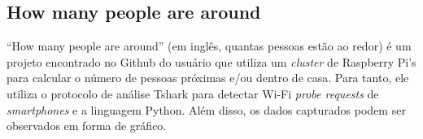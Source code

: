 \subsection{How many people are around}
``How many people are around'' (em inglês, quantas pessoas estão ao redor) é um projeto encontrado no Github do usuário  que utiliza um \emph{cluster} de Raspberry Pi's para calcular o número de pessoas próximas e/ou dentro de casa. Para tanto, ele utiliza o protocolo de análise Tshark para detectar Wi-Fi \emph{probe requests} de \emph{smartphones} e a linguagem Python. Além disso, os dados capturados podem ser observados em forma de gráfico.

